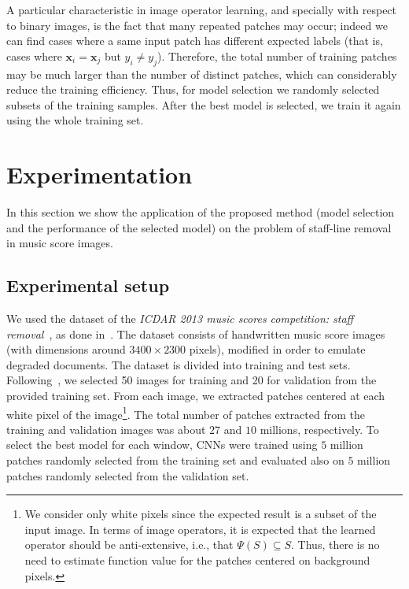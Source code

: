 \documentclass[conference]{IEEEtran}
\begin{document}
A particular characteristic in image operator learning, and specially
with respect to binary images, is the fact that many repeated patches
may occur; indeed we can find cases where a same input patch has
different expected labels (that is, cases where $\mathbf{x}_i =
\mathbf{x}_j$ but $y_i \neq y_j$). Therefore, the total number of
training patches may be much larger than the number of distinct
patches, which can considerably reduce the training efficiency.
Thus, for model selection we randomly selected subsets of the
training samples. After the best model is selected, we train it again  
using the whole training set.


\section{Experimentation}
\label{sec:experiments}

In this section we show the application of the proposed method (model
selection and the performance of the selected model) on the problem of
staff-line removal in music score images.

\subsection{Experimental setup}

We used the dataset of the \emph{ICDAR 2013 music scores
  competition: staff removal}~\cite{CompoICDAR2013}, as done
in~\cite{2017:IgorPR}. The dataset consists of handwritten music score
images (with dimensions around $3400\times 2300$ pixels), modified in
order to emulate degraded documents. The dataset is divided into
training and test sets. Following~\cite{2017:IgorPR}, we selected 50
images for training and 20 for validation from the provided training
set. From each image, we extracted patches centered at each white
pixel of the image\footnote{We consider only white
  pixels since the expected result is a subset of the input image. In
  terms of image operators, it is expected that the learned operator
  should be anti-extensive, i.e., that $\Psi(S) \subseteq S$. Thus,
  there is no need to estimate function value for the patches centered
  on background pixels.}.
The total number of patches extracted from the
training and validation images was about $27$ and $10$ millions,
respectively. To select the best model for each window, CNNs were
trained using $5$ million patches randomly selected from the training
set and evaluated also on $5$ million patches randomly selected from
the validation set.
\end{document}
